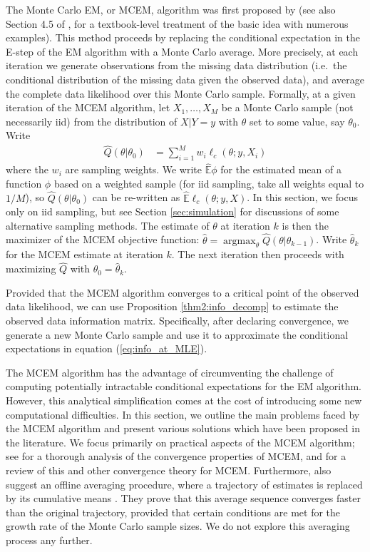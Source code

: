 \documentclass[ss]{imsart}
\theoremstyle{plain}
\theoremstyle{definition}
\theoremstyle{remark}
\newcommand{\bE}{\mathbb{E}}
\DeclareMathOperator*{\argmax}{argmax}
\begin{document}
The Monte Carlo EM, or MCEM, algorithm was first proposed by \citet{Wei90} (see also Section 4.5 of \citealp{Tan96}, for a textbook-level treatment of the basic idea with numerous examples). This method proceeds by replacing the conditional expectation in the E-step of the EM algorithm with a Monte Carlo average. More precisely, at each iteration we generate observations from the missing data distribution (i.e.\ the conditional distribution of the missing data given the observed data), and average the complete data likelihood over this Monte Carlo sample. Formally, at a given iteration of the MCEM algorithm, let $X_1,\ldots, X_M$ be a Monte Carlo sample (not necessarily iid) from the distribution of $X|Y=y$ with $\theta$ set to some value, say $\theta_0$. Write
%
\begin{align}
    \hat{Q}(\theta|\theta_0) &= \sum_{i=1}^M w_i \ell_c(\theta; y, X_i) \label{eq:MCEM_objective}
\end{align}
%
where the $w_i$ are sampling weights. We write $\hat{\bE} \phi$ \index{$\hat{\bE}$} for the estimated mean of a function $\phi$ based on a weighted sample (for iid sampling, take all weights equal to $1/M$), so $\hat{Q}(\theta|\theta_0)$ can be re-written as $\hat{\bE} \ell_c (\theta; y, X)$. In this section, we focus only on iid sampling, but see Section \ref{sec:simulation} for discussions of some alternative sampling methods. The estimate of $\theta$ at iteration $k$ is then the maximizer of the MCEM objective function: $\hat{\theta} = \argmax_\theta \hat{Q}(\theta|\theta_{k-1})$. Write $\hat{\theta}_{k}$ for the MCEM estimate at iteration $k$. The next iteration then proceeds with maximizing $\hat{Q}$ with $\theta_0 = \hat{\theta}_k$.  

Provided that the MCEM algorithm converges to a critical point of the observed data likelihood, we can use Proposition \ref{thm2:info_decomp} to estimate the observed data information matrix. Specifically, after declaring convergence, we generate a new Monte Carlo sample and use it to approximate the conditional expectations in equation (\ref{eq:info_at_MLE}).

The MCEM algorithm has the advantage of circumventing the challenge of computing potentially intractable conditional expectations for the EM algorithm. However, this analytical simplification comes at the cost of introducing some new computational difficulties. In this section, we outline the main problems faced by the MCEM algorithm and present various solutions which have been proposed in the literature. We focus primarily on practical aspects of the MCEM algorithm; see \citet{For03} for a thorough analysis of the convergence properties of MCEM, and \citet{Nea13} for a review of this and other convergence theory for MCEM. Furthermore, \citet{For03} also suggest an offline averaging procedure, where a trajectory of estimates is replaced by its cumulative means \citep[see also Section 11.1.2.2 of][]{Cap05}. They prove that this average sequence converges faster than the original trajectory, provided that certain conditions are met for the growth rate of the Monte Carlo sample sizes. We do not explore this averaging process any further.
\end{document}
